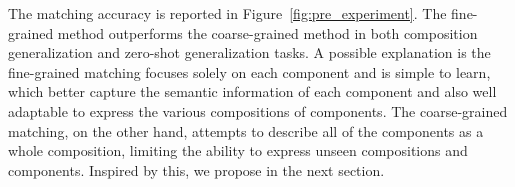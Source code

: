  The matching accuracy is reported in Figure~\ref{fig:pre_experiment}. The fine-grained method outperforms the coarse-grained method in both composition generalization and zero-shot generalization tasks. 
A possible explanation is the fine-grained matching focuses solely on each component and is simple to learn, which better capture the semantic information of each component and also well adaptable to express the various compositions of components. The coarse-grained matching, on the other hand,  attempts to describe all of the components as a whole composition, limiting the ability to express unseen compositions and components.
Inspired by this, we propose \smodel in the next section.




